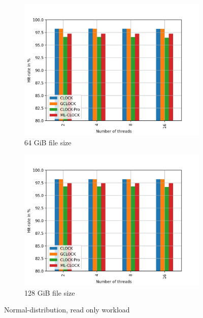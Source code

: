 \documentclass[
	12pt,
	a4paper,
	abstract,
	bibliography=totoc,
	chapterprefix,
	headings=openright,
	numbers=endperiod,
	parskip=half,
	twoside,
]{scrreprt}
\begin{document}
\begin{figure}[H]
\begin{subfigure}{0.4\textwidth}
		\includegraphics[width=\textwidth]{multi_64_gb_randread_normal.jpg}		
		\caption{64 GiB file size}
		\label{fig:rw_90to10 64 normal}
	\end{subfigure}
	\hfill
	\begin{subfigure}{0.4\textwidth}
		\includegraphics[width=\textwidth]{multi_128_gb_randread_normal.jpg}		
		\caption{128 GiB file size}
		\label{fig:rw_90to10 128 normal}
	\end{subfigure}
	\caption{Normal-distribution, read only workload}
	\label{fig:multi normal read only}
\end{figure}
\end{document}
